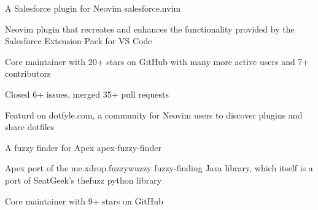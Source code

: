 

\begin{cventries}

  \cventry
    {A Salesforce plugin for Neovim} 
    {salesforce.nvim} 
    {} %
    {} %
    {
      \begin{cvitems} %
        \item {Neovim plugin that recreates and enhances the functionality provided by the Salesforce Extension Pack for VS Code}
        \item {Core maintainer with 20+ stars on GitHub with many more active users and 7+ contributors}
        \item {Closed 6+ issues, merged 35+ pull requests}
        \item {Featurd on dotfyle.com, a community for Neovim users to discover plugins and share dotfiles}
      \end{cvitems}
    }

  \cventry
    {A fuzzy finder for Apex} 
    {apex-fuzzy-finder} 
    {} %
    {} %
    {
      \begin{cvitems} %
        \item {Apex port of the me.xdrop.fuzzywuzzy fuzzy-finding Java library, which itself is a port of SeatGeek's thefuzz python library}
        \item {Core maintainer with 9+ stars on GitHub}
      \end{cvitems}
    }

\end{cventries}
